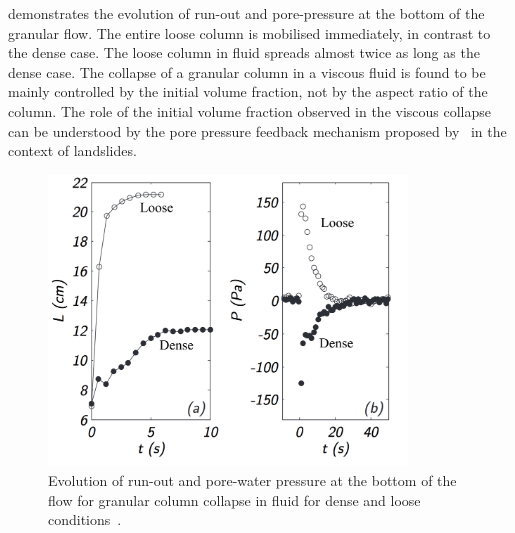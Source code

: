  demonstrates the evolution of run-out 
and pore-pressure at the bottom of the granular flow. The entire loose column 
is 
mobilised immediately, in contrast to the dense case. The loose column in fluid 
spreads almost twice as long as the dense case. The collapse of a granular 
column in a viscous fluid is found to be mainly controlled by the initial 
volume fraction, not by the aspect ratio of the column. The role of the initial 
volume fraction observed in the viscous collapse can be understood by the pore 
pressure feedback mechanism proposed by~\citet{Schaeffer2008,Iverson2000} in 
the context of landslides. 

\begin{figure}[htbp]
\centering
\includegraphics[width=0.85\textwidth]{Runout_PWP_Fluid_Exp}
\caption{Evolution of run-out and pore-water pressure at the bottom of the flow 
for 
granular column collapse in fluid for dense and loose 
conditions~\citep{Rondon2011}.}
\label{fig:Runout_PWP_Fluid_Exp}
\end{figure}

